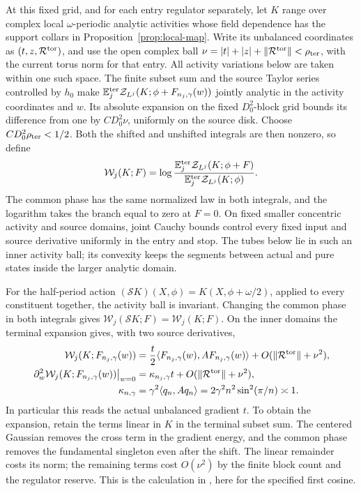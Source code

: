 At this fixed grid, and for each entry regulator separately, let \(K\)
range over complex local \(\omega\)-periodic analytic activities whose
field dependence has the support collars in Proposition~\ref{prop:local-map}.
Write its unbalanced coordinates as \((t,z,\mathcal R^{\rm tor})\),
and use the open complex ball
\(\nu=|t|+|z|+\|\mathcal R^{\rm tor}\|<\rho_{\rm ter}\), with the
current torus norm for that entry.  All activity variations below are
taken within one such space.  The finite subset sum and the source
Taylor series controlled by \(h_0\) make
\(\mathbb E_j^{\rm ter}\mathcal Z_{L^j}(K;\phi+F_{n_j,\gamma}(w))\) jointly analytic
in the activity coordinates and \(w\).  Its absolute expansion on the
fixed \(D_0^2\)-block grid bounds its difference from one by
\(CD_0^2\nu\), uniformly on the source disk.  Choose
\(CD_0^2\rho_{\rm ter}<1/2\).  Both the shifted and unshifted integrals
are then nonzero, so define
\begin{equation}\label{trj:neutral-response}
 \mathcal W_j(K;F)=
 \log\frac{\mathbb E_j^{\rm ter}\mathcal Z_{L^j}(K;\phi+F)}
               {\mathbb E_j^{\rm ter}\mathcal Z_{L^j}(K;\phi)}.
\end{equation}
The common phase has the same normalized law in both integrals, and
the logarithm takes the branch equal to zero at \(F=0\).  On fixed
smaller concentric activity and source domains, joint Cauchy bounds
control every fixed input and source derivative uniformly in the
entry and stop.  The tubes below lie in such an inner activity ball;
its convexity keeps the segments between actual and pure states inside
the larger analytic domain.

For the half-period action
\((\mathcal S K)(X,\phi)=K(X,\phi+\omega/2)\), applied to every
constituent together, the activity ball is invariant.  Changing the
common phase in both integrals gives
\(\mathcal W_j(\mathcal S K;F)=\mathcal W_j(K;F)\).
On the inner domains the terminal expansion gives, with two source
derivatives,
\begin{equation}\label{trj:neutral-readout}
 \begin{split}
 \mathcal W_j(K;F_{n_j,\gamma}(w))
   &=\frac t2\langle F_{n_j,\gamma}(w),AF_{n_j,\gamma}(w)\rangle
             +O(\|\mathcal R^{\rm tor}\|+\nu^2),\\
 \left.\partial_w^2\mathcal W_j(K;F_{n_j,\gamma}(w))\right|_{w=0}
   &=\kappa_{n_j,\gamma}t+O(\|\mathcal R^{\rm tor}\|+\nu^2),\\
 \kappa_{n,\gamma}
   &=\gamma^2\langle q_n,Aq_n\rangle
     =2\gamma^2n^2\sin^2(\pi/n)\asymp1.
 \end{split}
\end{equation}
In particular this reads the actual unbalanced gradient \(t\).
To obtain the expansion, retain the terms linear in \(K\) in the
terminal subset sum.  The centered Gaussian removes the cross term in
the gradient energy, and the common phase removes the fundamental
singleton even after the shift.  The linear remainder costs its norm;
the remaining terms cost \(O(\nu^2)\) by the finite block count and
the regulator reserve.  This is the calculation in
\cite[Equations~(10.2)--(10.3)]{B}, here for the specified first cosine.

